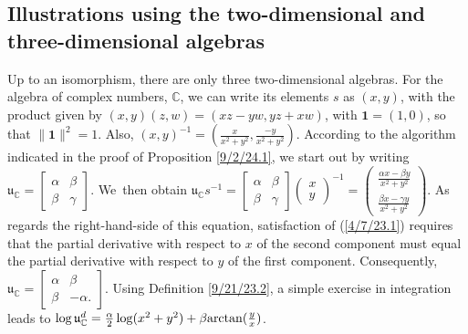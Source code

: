 \documentclass{amsart}
\numberwithin{equation}{section}
\theoremstyle{definition}
\numberwithin{theorem}{section}
\begin{document}
\subsection{Illustrations using the two-dimensional and three-dimensional algebras}
Up to an isomorphism, there are only three two-dimensional algebras.
For the algebra of complex numbers, $\mathbb{C}$, we can write its elements $s$ as $(x,y)$, with the product given by $(x,y)(z,w) = (xz-yw, yz+xw)$, with $\mathbf{1}=(1,0)$, so that $\|\mathbf{1}\|^2=1$.  Also, $(x,y)^{-1} = (\frac{x}{x^2+y^2},\frac{-y}{x^2+y^2})$.  According to the algorithm indicated in the proof of Proposition \ref{9/2/24.1}, we start out by writing  $\mathfrak{u}_\mathbb{C} = \left[\begin{array}{ccc}
 \alpha & \beta   \\ 
 \beta & \gamma    
\end{array}\right]$.  \mbox{We then} obtain  $\mathfrak{u}_\mathbb{C}s^{-1} = \left[\begin{array}{ccc}
 \alpha & \beta   \\ 
 \beta & \gamma    
\end{array}\right]\left(\begin{array}{ccc}
x   \\ 
y   
\end{array}\right)^{-1} = \left(\begin{array}{ccc}
\frac{\alpha x - \beta y}{x^2+y^2}  \\ 
\frac{\beta x - \gamma y}{x^2+y^2} 
\end{array}\right)$.  As regards the right-hand-side of this equation, satisfaction of (\ref{4/7/23.1}) requires that the partial derivative with respect to $x$ of the second component must equal the partial derivative with respect to $y$ of the first component.  Consequently, $\mathfrak{u}_{\mathbb{C}} = \left[\begin{array}{ccc}
 \alpha & \beta   \\ 
 \beta & -\alpha.    
\end{array}\right]$.  Using Definition \ref{9/21/23.2}, a simple exercise in integration leads to $\log  \mathfrak{u}^d_{\mathbb{C}} = \frac{\alpha}{2}\log(x^2+y^2) + \beta{\rm arctan}(\frac{y}{x})$.
\end{document}
